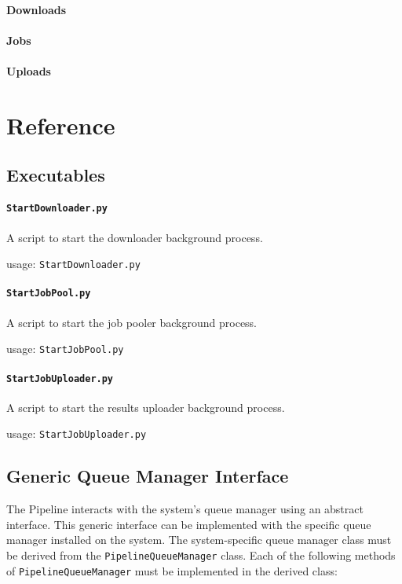 \paragraph{Downloads}

\paragraph{Jobs}

\paragraph{Uploads}


\section{Reference}
\subsection{Executables}
\paragraph{\texttt{StartDownloader.py}}
A script to start the downloader background process.

usage: \texttt{StartDownloader.py}

\paragraph{\texttt{StartJobPool.py}}
A script to start the job pooler background process.

usage: \texttt{StartJobPool.py}

\paragraph{\texttt{StartJobUploader.py}}
A script to start the results uploader background process.

usage: \texttt{StartJobUploader.py}

\subsection{Generic Queue Manager Interface}
The Pipeline interacts with the system's queue manager using an abstract interface. This generic interface can be implemented with the specific queue manager installed on the system. The system-specific queue manager class must be derived from the \texttt{PipelineQueueManager} class. Each of the following methods of \texttt{PipelineQueueManager} must be implemented in the derived class:


